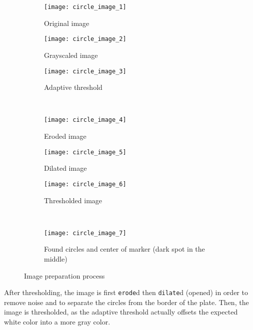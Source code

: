 \begin{figure}[ht]
\centering
\begin{subfigure}[b]{0.3\linewidth}
\centering
    \texttt{[image: circle\_image\_1]}
    \caption{Original image}
\label{fig:circle_process_examples_1}
\end{subfigure}
\begin{subfigure}[b]{0.3\linewidth}
\centering
    \texttt{[image: circle\_image\_2]}
    \caption{Grayscaled image}
\label{fig:circle_process_examples_2}
\end{subfigure}
\begin{subfigure}[b]{0.3\linewidth}
\centering
    \texttt{[image: circle\_image\_3]}
    \caption{Adaptive threshold}
\label{fig:circle_process_examples_3}
\end{subfigure}\\
\begin{subfigure}[b]{0.3\linewidth}
\centering
    \texttt{[image: circle\_image\_4]}
    \caption{Eroded image}
\label{fig:circle_process_examples_4}
\end{subfigure}
\begin{subfigure}[b]{0.3\linewidth}
\centering
    \texttt{[image: circle\_image\_5]}
    \caption{Dilated image}
\label{fig:circle_process_examples_5}
\end{subfigure}
\begin{subfigure}[b]{0.3\linewidth}
\centering
    \texttt{[image: circle\_image\_6]}
    \caption{Thresholded image}
\label{fig:circle_process_examples_6}
\end{subfigure}\\
\begin{subfigure}[b]{0.9\linewidth}
\centering
    \texttt{[image: circle\_image\_7]}
    \caption{Found circles and center of marker (dark spot in the middle)}
\label{fig:circle_process_examples_7}
\end{subfigure}
\caption{Image preparation process}
\label{fig:circle_process_examples}
\end{figure}

After thresholding, the image is first \verb|erode|d then \verb|dilate|d (opened) in order to remove noise and to separate the circles from the border of the plate.
Then, the image is thresholded, as the adaptive threshold actually offsets the expected white color into a more gray color.

